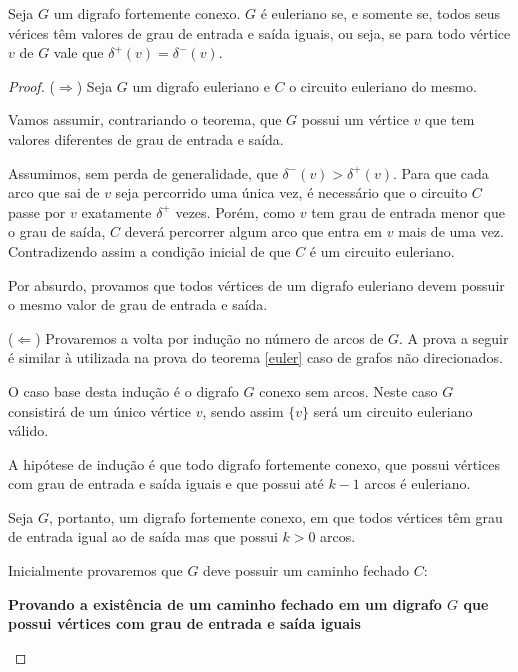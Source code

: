 \begin{theorem}

    Seja $G$ um digrafo fortemente conexo.
$G$ é euleriano se, e somente se, todos seus vérices têm valores de grau de entrada e saída iguais, ou seja, se para todo vértice $v$ de $G$ vale que $\delta^+(v) = \delta^-(v)$.
\label{euler-digraph}
\end{theorem}


\begin{proof}

    ($\Rightarrow$) Seja $G$ um digrafo euleriano e $C$ o circuito euleriano do mesmo. 

    Vamos assumir, contrariando o teorema, que $G$ possui um vértice $v$ que tem valores diferentes de grau de entrada e saída.

    Assumimos, sem perda de generalidade, que $\delta^-(v) > \delta^+(v)$. 
    Para que cada arco que sai de $v$ seja percorrido uma única vez, é necessário que o circuito $C$ passe por $v$ exatamente $\delta^+$ vezes. 
    Porém, como $v$ tem grau de entrada menor que o grau de saída, $C$ deverá percorrer algum arco que entra em $v$ mais de uma vez. 
    Contradizendo assim a condição inicial de que $C$ é um circuito euleriano.

    Por absurdo, provamos que todos vértices de um digrafo euleriano devem possuir o mesmo valor de grau de entrada e saída.

    ($\Leftarrow$) Provaremos a volta por indução no número de arcos de $G$. 
    A prova a seguir é similar à utilizada na prova do teorema \ref{euler} caso de grafos não direcionados.

    O caso base desta indução é o digrafo $G$ conexo sem arcos. Neste caso $G$ consistirá de um único vértice $v$, sendo assim $\{v\}$ será um circuito euleriano válido. 

    A hipótese de indução é que todo digrafo fortemente conexo, que possui vértices com grau de entrada e saída iguais e que possui até $k-1$ arcos é euleriano.

    Seja $G$, portanto, um digrafo fortemente conexo, em que todos vértices têm grau de entrada igual ao de saída mas que possui $k > 0$ arcos.

    Inicialmente provaremos que $G$ deve possuir um caminho fechado $C$:

    \begin{tcolorbox}
        \textbf{Provando a existência de um caminho fechado em um digrafo $G$ que possui vértices com grau de entrada e saída iguais}


\end{tcolorbox}
\end{proof}
